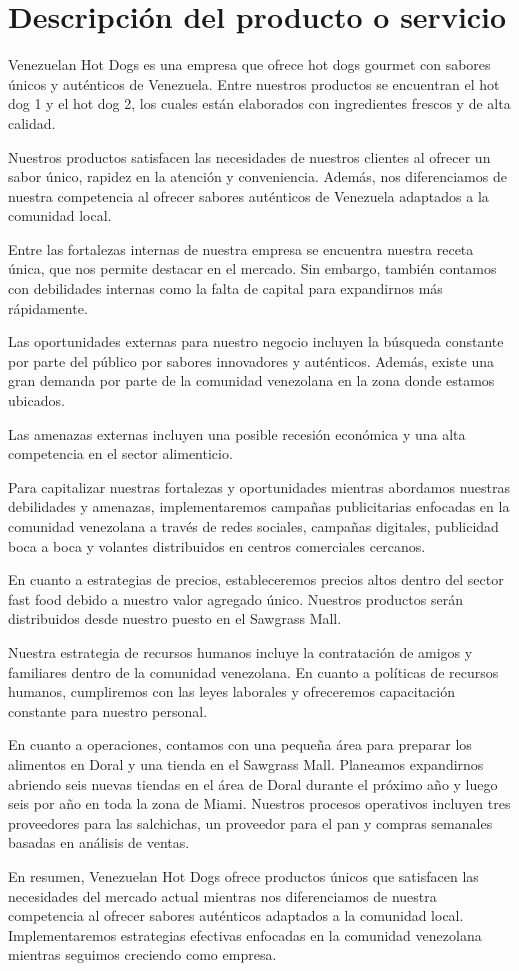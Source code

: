 \section{Descripción del producto o servicio}\label{sec:producto}

Venezuelan Hot Dogs es una empresa que ofrece hot dogs gourmet con sabores únicos y auténticos de Venezuela. Entre nuestros productos se encuentran el hot dog 1 y el hot dog 2, los cuales están elaborados con ingredientes frescos y de alta calidad.

Nuestros productos satisfacen las necesidades de nuestros clientes al ofrecer un sabor único, rapidez en la atención y conveniencia. Además, nos diferenciamos de nuestra competencia al ofrecer sabores auténticos de Venezuela adaptados a la comunidad local.

Entre las fortalezas internas de nuestra empresa se encuentra nuestra receta única, que nos permite destacar en el mercado. Sin embargo, también contamos con debilidades internas como la falta de capital para expandirnos más rápidamente.

Las oportunidades externas para nuestro negocio incluyen la búsqueda constante por parte del público por sabores innovadores y auténticos. Además, existe una gran demanda por parte de la comunidad venezolana en la zona donde estamos ubicados.

Las amenazas externas incluyen una posible recesión económica y una alta competencia en el sector alimenticio.

Para capitalizar nuestras fortalezas y oportunidades mientras abordamos nuestras debilidades y amenazas, implementaremos campañas publicitarias enfocadas en la comunidad venezolana a través de redes sociales, campañas digitales, publicidad boca a boca y volantes distribuidos en centros comerciales cercanos.

En cuanto a estrategias de precios, estableceremos precios altos dentro del sector fast food debido a nuestro valor agregado único. Nuestros productos serán distribuidos desde nuestro puesto en el Sawgrass Mall.

Nuestra estrategia de recursos humanos incluye la contratación de amigos y familiares dentro de la comunidad venezolana. En cuanto a políticas de recursos humanos, cumpliremos con las leyes laborales y ofreceremos capacitación constante para nuestro personal.

En cuanto a operaciones, contamos con una pequeña área para preparar los alimentos en Doral y una tienda en el Sawgrass Mall. Planeamos expandirnos abriendo seis nuevas tiendas en el área de Doral durante el próximo año y luego seis por año en toda la zona de Miami. Nuestros procesos operativos incluyen tres proveedores para las salchichas, un proveedor para el pan y compras semanales basadas en análisis de ventas.

En resumen, Venezuelan Hot Dogs ofrece productos únicos que satisfacen las necesidades del mercado actual mientras nos diferenciamos de nuestra competencia al ofrecer sabores auténticos adaptados a la comunidad local. Implementaremos estrategias efectivas enfocadas en la comunidad venezolana mientras seguimos creciendo como empresa.